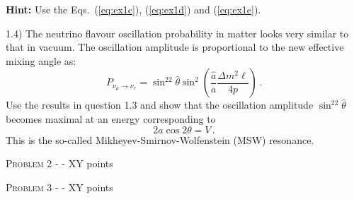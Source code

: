 \documentclass[a4paper,11pt]{report}
\begin{document}
{\bf Hint:} Use the Eqs.~(\ref{eq:ex1c}), (\ref{eq:ex1d}) and (\ref{eq:ex1e}).

1.4) The neutrino flavour oscillation probability in matter looks very similar to that in vacuum. The oscillation amplitude is proportional to the new effective mixing angle as:
\begin{equation}
P_{\nu_\mu\to\nu_e} = \sin^22\hat{\theta}\sin^2\left(\frac{\hat{a}}{a}\frac{\Delta m^2\ell}{4p}\right)\,.
\end{equation}
Use the results in question 1.3 and show that the oscillation amplitude $\sin^22\hat{\theta}$ becomes maximal at an energy corresponding to 
\begin{equation}
2a\cos2\theta = V\,.
\end{equation} 
This is the so-called Mikheyev-Smirnov-Wolfenstein (MSW) resonance.
\vspace{1cm}

{\large \textsc{Problem 2 - } - XY points}
\vspace{1cm}

{\large \textsc{Problem 3 - } - XY points}
\end{document}
